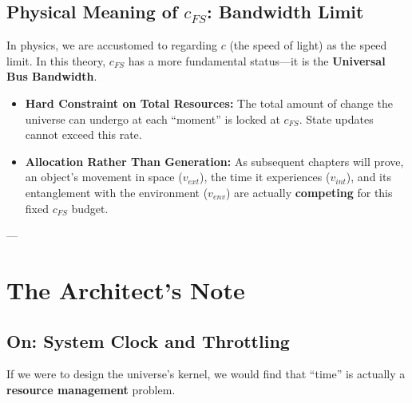 \subsection{Physical Meaning of $c_{FS}$: Bandwidth Limit}

In physics, we are accustomed to regarding \textbf{$c$} (the speed of light) as the speed limit. In this theory, \textbf{$c_{FS}$} has a more fundamental status---it is the \textbf{Universal Bus Bandwidth}.

\begin{itemize}
\item \textbf{Hard Constraint on Total Resources:} The total amount of change the universe can undergo at each ``moment'' is locked at \textbf{$c_{FS}$}. State updates cannot exceed this rate.

\item \textbf{Allocation Rather Than Generation:} As subsequent chapters will prove, an object's movement in space (\textbf{$v_{ext}$}), the time it experiences (\textbf{$v_{int}$}), and its entanglement with the environment (\textbf{$v_{env}$}) are actually \textbf{competing} for this fixed \textbf{$c_{FS}$} budget.
\end{itemize}

---

\section{The Architect's Note}

\subsection{On: System Clock and Throttling}

If we were to design the universe's kernel, we would find that ``time'' is actually a \textbf{resource management} problem.

